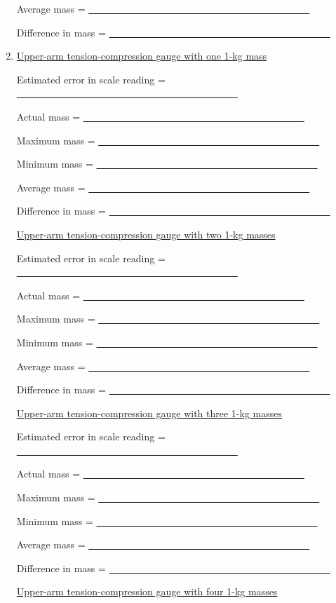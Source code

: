 \begin{enumerate}[label=\arabic*.]
Average mass = \ul{~~~~~~~~~~~~~~~~~~~~~~~~~~~~~~~~~~~~~~~~~~~~~}

Difference in mass = \ul{~~~~~~~~~~~~~~~~~~~~~~~~~~~~~~~~~~~~~~~~~~~~~}

\item \ul{Upper-arm tension-compression gauge with one 1-kg mass}

Estimated error in scale reading = \ul{~~~~~~~~~~~~~~~~~~~~~~~~~~~~~~~~~~~~~~~~~~~~~}

Actual mass = \ul{~~~~~~~~~~~~~~~~~~~~~~~~~~~~~~~~~~~~~~~~~~~~~}

Maximum mass = \ul{~~~~~~~~~~~~~~~~~~~~~~~~~~~~~~~~~~~~~~~~~~~~~}

Minimum mass = \ul{~~~~~~~~~~~~~~~~~~~~~~~~~~~~~~~~~~~~~~~~~~~~~}

Average mass = \ul{~~~~~~~~~~~~~~~~~~~~~~~~~~~~~~~~~~~~~~~~~~~~~}

Difference in mass = \ul{~~~~~~~~~~~~~~~~~~~~~~~~~~~~~~~~~~~~~~~~~~~~~}

\ul{Upper-arm tension-compression gauge with two 1-kg masses}

Estimated error in scale reading = \ul{~~~~~~~~~~~~~~~~~~~~~~~~~~~~~~~~~~~~~~~~~~~~~}

Actual mass = \ul{~~~~~~~~~~~~~~~~~~~~~~~~~~~~~~~~~~~~~~~~~~~~~}

Maximum mass = \ul{~~~~~~~~~~~~~~~~~~~~~~~~~~~~~~~~~~~~~~~~~~~~~}

Minimum mass = \ul{~~~~~~~~~~~~~~~~~~~~~~~~~~~~~~~~~~~~~~~~~~~~~}

Average mass = \ul{~~~~~~~~~~~~~~~~~~~~~~~~~~~~~~~~~~~~~~~~~~~~~}

Difference in mass = \ul{~~~~~~~~~~~~~~~~~~~~~~~~~~~~~~~~~~~~~~~~~~~~~}

\ul{Upper-arm tension-compression gauge with three 1-kg masses}

Estimated error in scale reading = \ul{~~~~~~~~~~~~~~~~~~~~~~~~~~~~~~~~~~~~~~~~~~~~~}

Actual mass = \ul{~~~~~~~~~~~~~~~~~~~~~~~~~~~~~~~~~~~~~~~~~~~~~}

Maximum mass = \ul{~~~~~~~~~~~~~~~~~~~~~~~~~~~~~~~~~~~~~~~~~~~~~}

Minimum mass = \ul{~~~~~~~~~~~~~~~~~~~~~~~~~~~~~~~~~~~~~~~~~~~~~}

Average mass = \ul{~~~~~~~~~~~~~~~~~~~~~~~~~~~~~~~~~~~~~~~~~~~~~}

Difference in mass = \ul{~~~~~~~~~~~~~~~~~~~~~~~~~~~~~~~~~~~~~~~~~~~~~}

\ul{Upper-arm tension-compression gauge with four 1-kg masses}


\end{enumerate}
